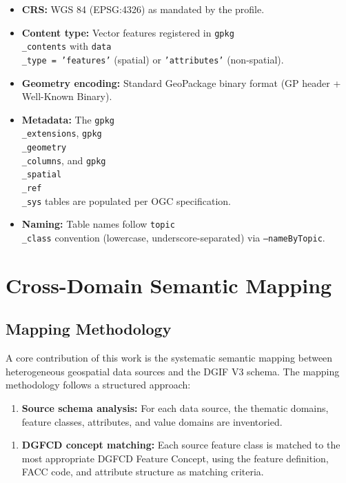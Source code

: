 \documentclass[conference]{IEEEtran}
\begin{document}
\begin{itemize}[leftmargin=*]
\item \textbf{CRS:} WGS 84 (EPSG:4326) as mandated by the profile.
\item \textbf{Content type:} Vector features registered in \texttt{gpkg\\_contents} with \texttt{data\\_type = 'features'} (spatial) or \texttt{'attributes'} (non-spatial).
\item \textbf{Geometry encoding:} Standard GeoPackage binary format (GP header + Well-Known Binary).
\item \textbf{Metadata:} The \texttt{gpkg\\_extensions}, \texttt{gpkg\\_geometry\\_columns}, and \texttt{gpkg\\_spatial\\_ref\\_sys} tables are populated per OGC specification.
\item \textbf{Naming:} Table names follow \texttt{topic\\_class} convention (lowercase, underscore-separated) via \texttt{--nameByTopic}.
\end{itemize}



\section{Cross-Domain Semantic Mapping}

\subsection{Mapping Methodology}

A core contribution of this work is the systematic semantic mapping between heterogeneous geospatial data sources and the DGIF V3 schema. The mapping methodology follows a structured approach:

\begin{enumerate}[leftmargin=*]
\item \textbf{Source schema analysis:} For each data source, the thematic domains, feature classes, attributes, and value domains are inventoried.
\end{enumerate}

\begin{enumerate}[leftmargin=*]
\item \textbf{DGFCD concept matching:} Each source feature class is matched to the most appropriate DGFCD Feature Concept, using the feature definition, FACC code, and attribute structure as matching criteria.
\end{enumerate}
\end{document}

